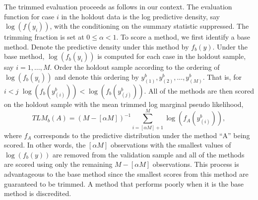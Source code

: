 \documentclass[ba]{imsart}
\begin{document}
The trimmed evaluation proceeds as follows in our context.  The evaluation function for case $i$ in the holdout data
is the log predictive density, say
$\log(f(y_i))$, with the conditioning on the 
summary statistic suppressed.  The trimming 
fraction is set at $0 \leq \alpha < 1$. To score a method,
we first identify a base method. Denote the predictive density under this method by $f_{b}(y)$.  Under the base method, $\log(f_{b}(y_i))$ is computed for each case in the 
holdout sample, say $i = 1, \ldots, M$.  Order the holdout sample according to the ordering of $\log(f_{b}(y_i))$ and denote this
ordering by $y_{(1)}^b, y_{(2)}^b, \dots, y_{(M)}^b$. That is, for $i<j$
$\log(f_{b}(y_{(i)}^b))<\log(f_{b}(y_{(j)}^b))$. All of the methods are then scored on the holdout sample with the mean trimmed log marginal pseudo likelihood, 
\[TLM_b(A) = (M - [\alpha M])^{-1} \sum_{i=[\alpha M]+1}^{M}
    \log(f_A(y_{(i)}^b)),\]
 where $f_A$ corresponds to the predictive
 distribution under the method ``A'' being scored.  In other words, the $[\alpha M]$ observations with the smallest values of $\log(f_{b}(y))$ are 
removed from the validation sample and all of the methods are scored using only the
remaining $M - [\alpha M]$ observations. This process is advantageous to the base method since the smallest scores from this method are guaranteed to be trimmed.  A method
that performs poorly when it is the base method is discredited.  %
\end{document}
